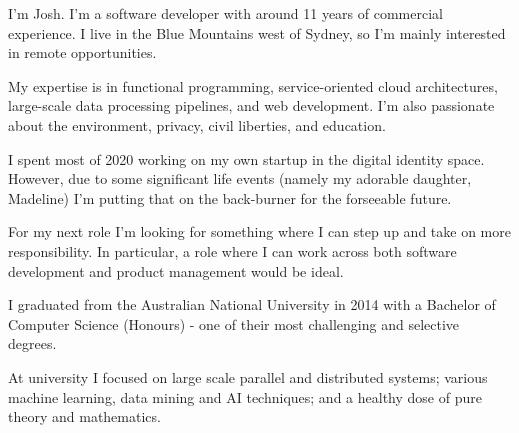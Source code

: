 


\begin{cvletter}
  I'm Josh. I’m a software developer with around 11 years of commercial experience. I live in the Blue Mountains west of Sydney, so I'm mainly interested in remote opportunities.

  My expertise is in functional programming, service-oriented cloud architectures, large-scale data processing pipelines, and web development. I'm also passionate about the environment, privacy, civil liberties, and education.

  I spent most of 2020 working on my own startup in the digital identity space. However, due to some significant life events (namely my adorable daughter, Madeline) I'm putting that on the back-burner for the forseeable future.

  For my next role I'm looking for something where I can step up and take on more responsibility. In particular, a role where I can work across both software development and product management would be ideal.

  I graduated from the Australian National University in 2014 with a Bachelor of Computer
  Science (Honours) - one of their most challenging and selective degrees.

  At university I focused on large scale parallel and distributed systems; various machine learning, data mining and AI techniques; and a healthy dose of pure theory and mathematics.

\end{cvletter}